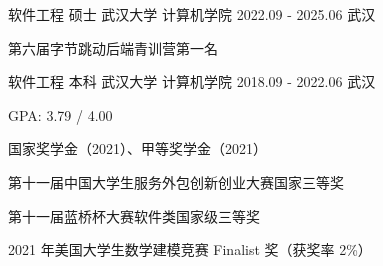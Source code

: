 

\begin{cventries}

  \cventry
    {软件工程 \quad 硕士} %
    {武汉大学 \quad 计算机学院} %
    {2022.09 - 2025.06} %
    {武汉} %
    {
      \begin{cvitems} %
        \item {第六届字节跳动后端青训营第一名}
      \end{cvitems}
    }

  \cventry
    {软件工程 \quad 本科} %
    {武汉大学 \quad 计算机学院} %
    {2018.09 - 2022.06} %
    {武汉} %
    {
      \begin{cvitems} %
        \item {GPA: 3.79 / 4.00}
        \item {国家奖学金（2021）、甲等奖学金（2021）}
        \item {第十一届中国大学生服务外包创新创业大赛国家三等奖}
        \item {第十一届蓝桥杯大赛软件类国家级三等奖}
        \item {2021 年美国大学生数学建模竞赛 Finalist 奖（获奖率 2\%）}
      \end{cvitems}
    }

\end{cventries}
